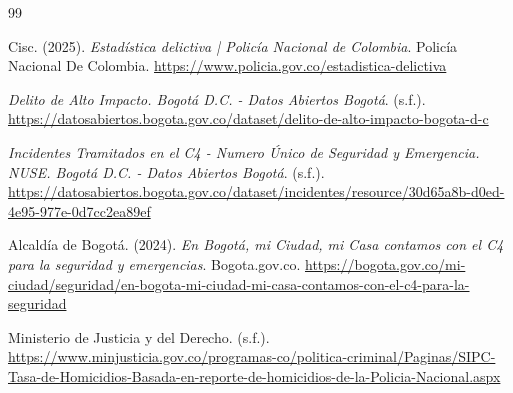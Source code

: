 \documentclass[12pt,letterpaper]{article}
\begin{document}
\begin{thebibliography}{99}
\raggedright

Cisc. (2025). \textit{Estadística delictiva | Policía Nacional de Colombia}. Policía Nacional De Colombia. \url{https://www.policia.gov.co/estadistica-delictiva}

\textit{Delito de Alto Impacto. Bogotá D.C. - Datos Abiertos Bogotá}. (s.f.). \url{https://datosabiertos.bogota.gov.co/dataset/delito-de-alto-impacto-bogota-d-c}

\textit{Incidentes Tramitados en el C4 - Numero Único de Seguridad y Emergencia. NUSE. Bogotá D.C. - Datos Abiertos Bogotá}. (s.f.). \url{https://datosabiertos.bogota.gov.co/dataset/incidentes/resource/30d65a8b-d0ed-4e95-977e-0d7cc2ea89ef}

Alcaldía de Bogotá. (2024). \textit{En Bogotá, mi Ciudad, mi Casa contamos con el C4 para la seguridad y emergencias}. Bogota.gov.co. \url{https://bogota.gov.co/mi-ciudad/seguridad/en-bogota-mi-ciudad-mi-casa-contamos-con-el-c4-para-la-seguridad}

Ministerio de Justicia y del Derecho. (s.f.). \url{https://www.minjusticia.gov.co/programas-co/politica-criminal/Paginas/SIPC-Tasa-de-Homicidios-Basada-en-reporte-de-homicidios-de-la-Policia-Nacional.aspx}

\end{thebibliography}
\end{document}
